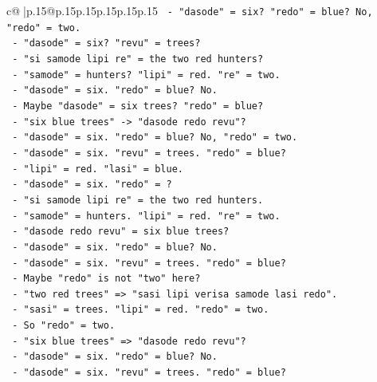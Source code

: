\documentclass{article}
\begin{document}
{\begin{supertabular}{c@{$\;$}|p{.15\linewidth}@{}p{.15\linewidth}p{.15\linewidth}p{.15\linewidth}p{.15\linewidth}p{.15\linewidth}}
{{{\texttt{                    {-} "dasode" = six? "redo" = blue? No, "redo" = two.} \\
\texttt{                    {-} "dasode" = six? "revu" = trees?} \\
\texttt{                    {-} "si samode lipi re" = the two red hunters?} \\
\texttt{                    {-} "samode" = hunters? "lipi" = red. "re" = two.} \\
\texttt{                    {-} "dasode" = six. "redo" = blue? No.} \\
\texttt{                    {-} Maybe "dasode" = six trees? "redo" = blue?} \\
\texttt{                    {-} "six blue trees" {-}> "dasode redo revu"?} \\
\texttt{                    {-} "dasode" = six. "redo" = blue? No, "redo" = two.} \\
\texttt{                    {-} "dasode" = six. "revu" = trees. "redo" = blue?} \\
\texttt{                    {-} "lipi" = red. "lasi" = blue.} \\
\texttt{                    {-} "dasode" = six. "redo" = ?} \\
\texttt{                    {-} "si samode lipi re" = the two red hunters.} \\
\texttt{                    {-} "samode" = hunters. "lipi" = red. "re" = two.} \\
\texttt{                    {-} "dasode redo revu" = six blue trees?} \\
\texttt{                    {-} "dasode" = six. "redo" = blue? No.} \\
\texttt{                    {-} "dasode" = six. "revu" = trees. "redo" = blue?} \\
\texttt{                    {-} Maybe "redo" is not "two" here?} \\
\texttt{                    {-} "two red trees" => "sasi lipi verisa samode lasi redo".} \\
\texttt{                    {-} "sasi" = trees. "lipi" = red. "redo" = two.} \\
\texttt{                    {-} So "redo" = two.} \\
\texttt{                    {-} "six blue trees" => "dasode redo revu"?} \\
\texttt{                    {-} "dasode" = six. "redo" = blue? No.} \\
\texttt{                    {-} "dasode" = six. "revu" = trees. "redo" = blue?} \\
}}}
\end{supertabular}}
\end{document}
